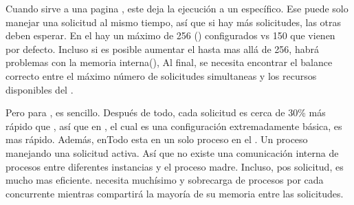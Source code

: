 Cuando \apacheDosNAME sirve a una pagina \phpNAME, este deja la ejecución \phpNAME a un \childProcessPC específico. Ese \childProcessPC puede solo manejar una solicitud \phpNAME al mismo tiempo, así que si hay más solicitudes, las otras deben esperar. En el \serverAS hay un máximo de 256 \clientsAS (\maxClientsDB) configurados vs 150 que vienen por defecto. Incluso si es posible aumentar el \maxClientsDB hasta mas allá de 256, habrá problemas con la memoria interna(\memoryRamPC), Al final, se necesita encontrar el balance correcto entre el máximo número de solicitudes simultaneas y los recursos disponibles del \serverAS.

Pero para \nodejsNAME, es sencillo. Después de todo, cada solicitud es cerca de 30\% más rápido que \phpNAME, así que en \performanceQA, el cual es una configuración extremadamente básica, \nodejsNAME es mas rápido. Además, en\nodejsNAME Todo esta en un solo proceso en el \serverAS. Un proceso manejando una solicitud activa. Así que no existe una comunicación interna de procesos entre diferentes instancias y el proceso madre. Incluso, pos solicitud, \nodejsNAME es mucho mas eficiente. \phpApacheNAME necesita muchísimo \phpNAME y sobrecarga de procesos por cada \workerClientINT concurrente mientras \nodejsNAME compartirá la mayoría de su memoria entre las solicitudes.


